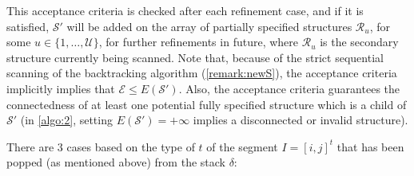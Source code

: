 This acceptance criteria is checked after each refinement case, and if it is satisfied, $\mathcal{S}'$ will be added on the array of partially specified structures $\mathcal{R}_u$, for some $u \in \{1, \ldots, \mathcal{U} \}$, for further refinements in future, where $\mathcal{R}_u$ is the secondary structure currently being  scanned. 
Note that, because of the strict sequential scanning of the backtracking algorithm (\cref{remark:newS}), 
the acceptance criteria implicitly implies that $\mathcal{E} \leq E(\mathcal{S}')$. Also, 
the acceptance criteria guarantees the connectedness of at least one potential fully specified structure which is a child of $\mathcal{S}'$  
(in  \cref{algo:2}, setting $E(\mathcal{S}') = +\infty$ implies a disconnected or invalid structure). 

There are $3$ cases based on the type of $t$ of the segment $I = [i,j]^t$ that has been popped (as mentioned above) from the stack $\delta$:



